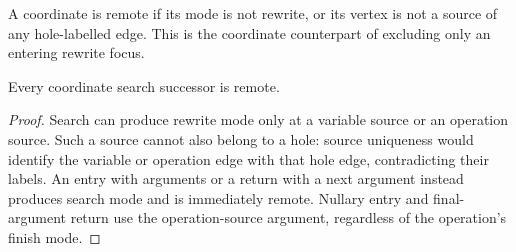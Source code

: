 \begin{definition}\label{term:remote-coordinate}
A coordinate is remote if its mode is not rewrite, or its vertex is not a source
of any hole-labelled edge. This is the coordinate counterpart of excluding only
an entering rewrite focus.
\end{definition}
\begin{lemma}
Every coordinate search successor is remote.
\end{lemma}
\begin{proof}
Search can produce rewrite mode only at a variable source or an operation source.
Such a source cannot also belong to a hole: source uniqueness would identify the
variable or operation edge with that hole edge, contradicting their labels.
An entry with arguments or a return with a next argument instead produces search
mode and is immediately remote. Nullary entry and final-argument return use the
operation-source argument, regardless of the operation's finish mode.
\end{proof}

